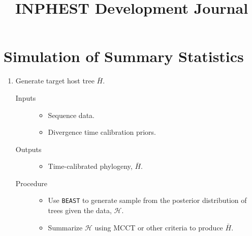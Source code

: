 \documentclass[11pt]{article}
\newcommand{\hostTreeSamples}{\mathcal{H}}
\newcommand{\targetHostTree}{\bar{H}}
\begin{document}
\title{INPHEST Development Journal}
\maketitle

\section{Simulation of Summary Statistics}
\label{summary-statistics-simulation-workflow} %

\begin{enumerate}
    \item Generate target host tree $\targetHostTree$.
    \begin{description}
        \item[Inputs]
            \begin{itemize}
                \item Sequence data.
                \item Divergence time calibration priors.
            \end{itemize}
        \item[Outputs]
            \begin{itemize}
                \item Time-calibrated phylogeny, $\targetHostTree$.
            \end{itemize}
        \item[Procedure]
            \begin{itemize}
                \item Use \texttt{BEAST} to generate sample from the posterior distribution of trees given the data, $\hostTreeSamples$.
                \item Summarize $\hostTreeSamples$ using MCCT or other criteria to produce $\targetHostTree$.
            \end{itemize}
    \end{description}


\end{enumerate}
\end{document}
